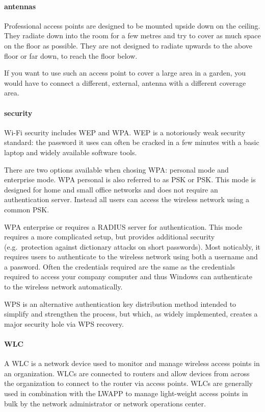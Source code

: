 \paragraph{antennas}
Professional access points are designed to be mounted upside down on the ceiling.
They radiate down into the room for a few metres and try to cover as much space on the floor as possible.
They are not designed to radiate upwards to the above floor or far down, to reach the floor below.

If you want to use such an access point to cover a large area in a garden, you would have to connect a different, external, antenna with a different coverage area.

\paragraph{security}
Wi-Fi security includes \ac{WEP} and \ac{WPA}.
\ac{WEP} is a notoriously weak security standard: the password it uses can often be cracked in a few minutes with a basic laptop and widely available software tools.

There are two options available when chosing \ac{WPA}: personal mode and enterprise mode.
\ac{WPA} personal is also referred to as \acs{PSK} or \acl{PSK}.
This mode is designed for home and small office networks and does not require an authentication server.
Instead all users can access the wireless network using a common \acl{PSK}.

\ac{WPA} enterprise or  requires a \ac{RADIUS} server for authentication.
This mode requires a more complicated setup, but provides additional security (e.g.\ protection against dictionary attacks on short passwords).
Most noticably, it requires users to authenticate to the wireless network using both a username and a password.
Often the credentials required are the same as the credentials required to access your company computer and thus Windows can authenticate to the wireless network automatically.

\ac{WPS} is an alternative authentication key distribution method intended to simplify and strengthen the process, but which, as widely implemented, creates a major security hole via \ac{WPS}  recovery.

\paragraph{\acl{WLC}}
A \acf{WLC} is a network device used to monitor and manage wireless access points in an organization.
\acsp{WLC} are connected to routers and allow devices from across the organization to connect to the router via access points.
\aclp{WLC} are generally used in combination with the \ac{LWAPP} to manage light-weight access points in bulk by the network administrator or network operations center.

